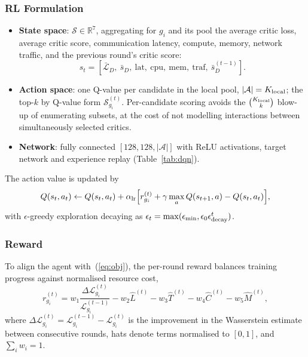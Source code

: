 \documentclass[journal]{IEEEtran}
\begin{document}
\subsubsection{RL Formulation}
\begin{itemize}
\item \textbf{State space}: $\mathcal{S}\in\mathbb{R}^7$, aggregating for $g_i$
      and its pool the average critic loss, average critic score,
      communication latency, compute, memory, network traffic, and the
      previous round's critic score:
      \begin{equation}
      s_t=[\bar{\mathcal{L}}_D,\ \bar{s}_D,\ \mathrm{lat},\ \mathrm{cpu},\
           \mathrm{mem},\ \mathrm{traf},\ \bar{s}^{(t-1)}_D].
      \label{eq:state}
      \end{equation}
\item \textbf{Action space}: one Q-value per candidate in the local pool,
      $|\mathcal{A}|=K_{\rm local}$; the top-$k$ by Q-value form
      $\mathcal{S}^{(t)}_{g_i}$. Per-candidate scoring avoids the
      $\binom{K_{\rm local}}{k}$ blow-up of enumerating subsets, at the cost
      of not modelling interactions between simultaneously selected critics.
\item \textbf{Network}: fully connected $[128,128,|\mathcal{A}|]$ with ReLU
      activations, target network and experience replay (Table~\ref{tab:dqn}).
\end{itemize}
The action value is updated by
\begin{equation}
Q(s_t,a_t)\leftarrow Q(s_t,a_t)+\alpha_{\rm lr}\Big[r^{(t)}_{g_i}
 +\gamma\max_{a}Q(s_{t+1},a)-Q(s_t,a_t)\Big],
\label{eq:q}
\end{equation}
with $\epsilon$-greedy exploration decaying as
$\epsilon_t=\max(\epsilon_{\min},\epsilon_0\epsilon^t_{\rm decay})$.

\subsubsection{Reward}
To align the agent with~(\ref{eq:obj}), the per-round reward balances training
progress against normalised resource cost,
\begin{equation}
r^{(t)}_{g_i}=w_1\frac{\Delta\mathcal{L}^{(t)}_{g_i}}{\mathcal{L}^{(t-1)}_{g_i}}
 -w_2\hat{L}^{(t)}-w_3\hat{T}^{(t)}-w_4\hat{C}^{(t)}-w_5\hat{M}^{(t)},
\label{eq:reward}
\end{equation}
where $\Delta\mathcal{L}^{(t)}_{g_i}=\mathcal{L}^{(t-1)}_{g_i}-\mathcal{L}^{(t)}_{g_i}$
is the improvement in the Wasserstein estimate between consecutive rounds,
hats denote terms normalised to $[0,1]$, and $\sum_iw_i=1$.
\end{document}
